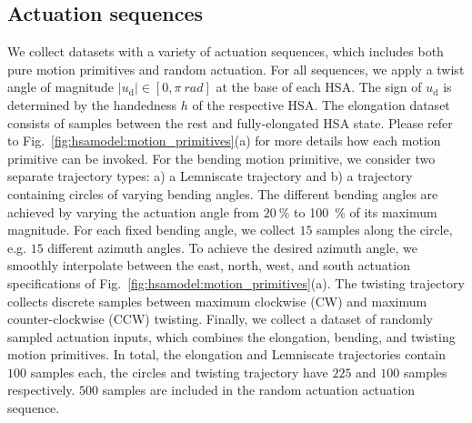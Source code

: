 \subsection{Actuation sequences}\label{sub:hsamodel:actuation_sequences}\label{sub:hsamodel:kinematics:actuation_sequences}
We collect datasets with a variety of actuation sequences, which includes both pure motion primitives and random actuation. 
For all sequences, we apply a twist angle of magnitude  $|u_\mathrm{d}| \in [0, \pi \: \si{rad}]$ at the base of each \gls{HSA}. The sign of $u_\mathrm{d}$ is determined by the handedness $h$ of the respective \gls{HSA}.
The elongation dataset consists of samples between the rest and fully-elongated \gls{HSA} state. Please refer to Fig.~\ref{fig:hsamodel:motion_primitives}(a) for more details how each motion primitive can be invoked.
For the bending motion primitive, we consider two separate trajectory types: a) a Lemniscate trajectory and b) a trajectory containing circles of varying bending angles. The different bending angles are achieved by varying the actuation angle from $\SI{20}{\percent}$ to \SI{100}{\percent} of its maximum magnitude. For each fixed bending angle, we collect $15$ samples along the circle, e.g. $15$ different azimuth angles.
To achieve the desired azimuth angle, we smoothly interpolate between the east, north, west, and south actuation specifications of Fig.~\ref{fig:hsamodel:motion_primitives}(a).
The twisting trajectory collects discrete samples between maximum clockwise (CW) and maximum counter-clockwise (CCW) twisting.
Finally, we collect a dataset of randomly sampled actuation inputs, which combines the elongation, bending, and twisting motion primitives. %
In total, the elongation and Lemniscate trajectories contain $100$ samples each, the circles and twisting trajectory have $225$ and $100$ samples respectively. $500$ samples are included in the random actuation actuation sequence.




